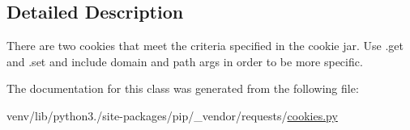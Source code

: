 \subsection{Detailed Description}
\begin{DoxyVerb}There are two cookies that meet the criteria specified in the cookie jar.
Use .get and .set and include domain and path args in order to be more specific.
\end{DoxyVerb}
 

The documentation for this class was generated from the following file\+:\begin{DoxyCompactItemize}
\item 
venv/lib/python3./site-\/packages/pip/\+\_\+vendor/requests/\hyperlink{cookies_8py}{cookies.\+py}\end{DoxyCompactItemize}

